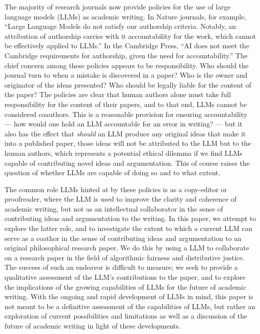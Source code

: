 The majority of research journals now provide policies for the use of large
language models (LLMs) as academic writing. In Nature journals, for example, ``Large Language Models do not
satisfy our authorship criteria. Notably, an attribution of authorship carries 
with it accountability for the work, which cannot be effectively applied to
LLMs.'' In the Cambridge Press, ``AI does not meet the Cambridge requirements
for authorship, given the need for accountability.'' The chief concern among
these policies appears to be responsibility. Who should the journal turn to when
a mistake is discovered in a paper? Who is the owner and originator of the ideas
presented? Who should be legally liable for the content of the paper? The
policies are clear that human authors alone must take full responsibility for the
content of their papers, and to that end, LLMs cannot be considered coauthors.
This is a reasonable provision for ensuring accountability — how would one hold
an LLM accountable for an error in writing? — but it also has the effect that
\emph{should} an LLM produce any original ideas that make it into a published
paper, those ideas will not be attributed to the LLM but to the human authors,
which represents a potential ethical dilemma if we find LLMs capable of
contributing novel ideas and argumentation. This of course raises the question
of whether LLMs are capable of doing so and to what extent.

The common role LLMs hinted at by these policies is as a copy-editor or
proofreader, where the LLM is used to improve the clarity and coherence of
academic writing, but not as an intellectual collaborator in the sense of 
contributing ideas and argumentation to the writing. In this paper, we attempt
to explore the latter role, and to investigate the extent to which a current LLM
can serve as a coathor in the sense of contributing ideas and argumentation to
an original philosophical research paper. We do this by using a LLM to
collaborate on a research paper in the field of algorithmic fairness and
distributive justice. The success of such an endeavor is difficult to measure;
we seek to provide a qualitative assessment of the LLM's contributions to the
paper, and to explore the implications of the growing capabilities of LLMs for
the future of academic writing. With the ongoing and rapid development of LLMs
in mind, this paper is not meant to be a definitive assessment of the
capabilities of LLMs, but rather an exploration of current possibilities and
limitations as well as a discussion of the future of academic writing in light
of these developments.


